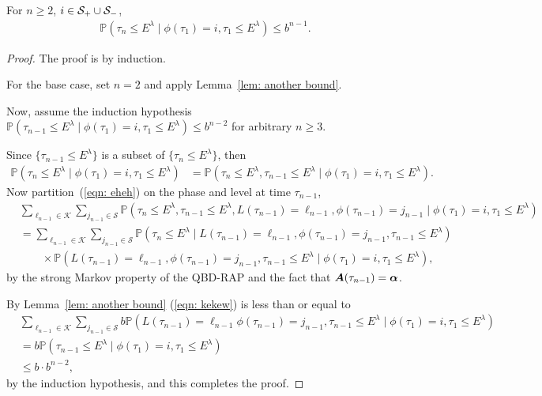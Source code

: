 \begin{lem}\label{lem: another bound 2}
	For \(n\geq 2\), \(i\in\mathcal S_+\cup \mathcal{S}_-\), 
	\begin{align}
		\mathbb P(\tau_n \leq E^\lambda \mid \phi(\tau_1) = i, \tau_1\leq E^\lambda) \leq b^{n-1}.
	\end{align}
\end{lem}
\begin{proof}
	The proof is by induction. 
	
	For the base case, set \(n=2\) and apply Lemma~\ref{lem: another bound}.

	Now, assume the induction hypothesis \(\mathbb P(\tau_{n-1} \leq E^\lambda \mid \phi(\tau_1) = i, \tau_1\leq E^\lambda) \leq b^{n-2}\) for arbitrary \(n\geq 3\). 
	
	Since \(\{\tau_{n-1}\leq E^\lambda\}\) is a subset of \(\{\tau_{n}\leq E^\lambda\}\), then 
	\begin{align}
		 \mathbb P(   \tau_n \leq E^\lambda \mid \phi(\tau_1) = i, \tau_1\leq E^\lambda)
		&= \mathbb P(   \tau_n \leq E^\lambda,  \tau_{n-1} \leq E^\lambda  \mid \phi(\tau_1) = i, \tau_1\leq E^\lambda). \label{eqn: eheh}
	\end{align}
	Now partition~(\ref{eqn: eheh}) on the phase and level at time \(\tau_{n-1}\),
	\begin{align}
		\nonumber&\sum_{\ell_{n-1}\in\mathcal K}\sum_{j_{n-1}\in\mathcal S}\mathbb P(  \tau_n \leq E^\lambda,  \tau_{n-1} \leq E^\lambda, L(\tau_{n-1}) = \ell_{n-1},\phi(\tau_{n-1}) = j_{n-1} \mid \phi(\tau_1) = i, \tau_1\leq E^\lambda)
		\\&\nonumber=  \sum_{\ell_{n-1}\in\mathcal K}\sum_{j_{n-1}\in\mathcal S}\mathbb P(  \tau_{n}\leq E^\lambda\mid  L(\tau_{n-1}) = \ell_{n-1}, \phi(\tau_{n-1}) = j_{n-1}, \tau_{n-1} \leq E^\lambda)
		\\&\qquad\times\mathbb P( L(\tau_{n-1}) = \ell_{n-1}, \phi(\tau_{n-1}) = j_{n-1}, \tau_{n-1}\leq E^\lambda \mid \phi(\tau_1) = i, \tau_1\leq E^\lambda), \label{eqn: kekew}
	\end{align}
	by the strong Markov property of the QBD-RAP and the fact that \(\boldsymbol A(\tau_{n-1})=\boldsymbol \alpha\). 
	 
	By Lemma~\ref{lem: another bound} (\ref{eqn: kekew}) is less than or equal to 
	\begin{align}
		&\sum_{\ell_{n-1}\in\mathcal K}\sum_{j_{n-1}\in\mathcal S} b
		\mathbb P( L(\tau_{n-1}) = \ell_{n-1} \phi(\tau_{n-1}) = j_{n-1}, \tau_{n-1}\leq E^\lambda\mid \phi(\tau_1) = i, \tau_1\leq E^\lambda) \nonumber
		\\&= b
		\mathbb P( \tau_{n-1}\leq E^\lambda\mid \phi(\tau_1) = i, \tau_1\leq E^\lambda)\nonumber
		\\&\leq b\cdot b^{n-2},
	\end{align}
	by the induction hypothesis, and this completes the proof. 
\end{proof}
%

